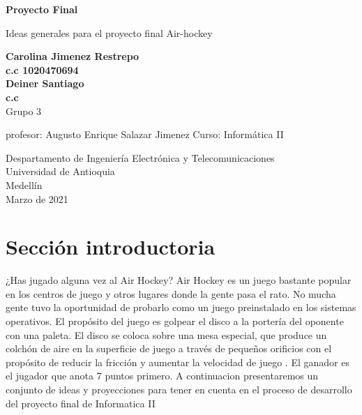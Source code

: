 \documentclass{article}
\begin{document}
\begin{titlepage}
    \begin{center}
        \vspace*{1cm}
            
        \Huge
        \textbf{Proyecto Final}
            
        \vspace{0.5cm}
        \LARGE
        Ideas generales para el proyecto final Air-hockey 
            
        \vspace{1.5cm}
            
        \textbf{Carolina Jimenez Restrepo}\\
        \textbf   { c.c 1020470694}\\
        \textbf{Deiner Santiago}\\
        \textbf{c.c }
          \\  Grupo 3
            
            \vspace{2.9cm}
         
                   profesor: Augusto Enrique Salazar Jimenez
                   Curso: Informática II
        \vfill
            
        \vspace{0.8cm}
            
        \Large
        Despartamento de Ingeniería Electrónica y Telecomunicaciones\\
        Universidad de Antioquia\\
        Medellín\\
        Marzo de 2021
            
    \end{center}
\end{titlepage}

\tableofcontents
\newpage
\section{Sección introductoria}\label{intro}
¿Has jugado alguna vez al Air Hockey? Air Hockey es un juego bastante popular en los centros de juego y otros lugares donde la gente pasa el rato. No mucha gente tuvo la oportunidad de probarlo como un juego preinstalado en los sistemas operativos. El propósito del juego es golpear el disco a la portería del oponente con una paleta. El disco se coloca sobre una mesa especial, que produce un colchón de aire en la superficie de juego a través de pequeños orificios con el propósito de reducir la fricción y aumentar la velocidad de juego . El ganador es el jugador que anota 7 puntos primero. 
A continuacion presentaremos un conjunto de ideas y proyecciones para tener en cuenta en el proceso de desarrollo del proyecto final de Informatica II
\end{document}
